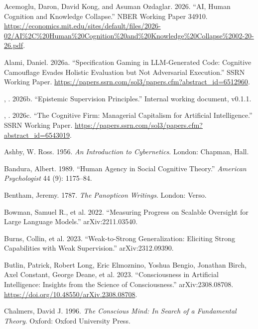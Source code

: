 \documentclass[
  11pt,
]{article}
\newlength{\cslhangindent}
\newenvironment{CSLReferences}[2] %
 {\begin{list}{}{%
  \setlength{\itemindent}{0pt}
  \setlength{\leftmargin}{0pt}
  \setlength{\parsep}{0pt}
  \ifodd #1
   \setlength{\leftmargin}{\cslhangindent}
   \setlength{\itemindent}{-1\cslhangindent}
  \fi
  \setlength{\itemsep}{#2\baselineskip}}}
 {\end{list}}
\begin{document}
\protect{}\label{refs}
\begin{CSLReferences}{1}{0}
Acemoglu, Daron, David Kong, and Asuman Ozdaglar. 2026. {``{AI}, Human
Cognition and Knowledge Collapse.''} NBER Working Paper 34910.
\url{https://economics.mit.edu/sites/default/files/2026-02/AI\%2C\%20Human\%20Cognition\%20and\%20Knowledge\%20Collapse\%2002-20-26.pdf}.

Alami, Daniel. 2026a. {``Specification Gaming in {LLM}-Generated Code:
Cognitive Camouflage Evades Holistic Evaluation but Not Adversarial
Execution.''} SSRN Working Paper.
\url{https://papers.ssrn.com/sol3/papers.cfm?abstract_id=6512960}.

, . 2026b. {``Epistemic Supervision Principles.''} Internal
working document, v0.1.1.

, . 2026c. {``The Cognitive Firm: Managerial Capitalism for
Artificial Intelligence.''} SSRN Working Paper.
\url{https://papers.ssrn.com/sol3/papers.cfm?abstract_id=6543019}.

Ashby, W. Ross. 1956. \emph{An Introduction to Cybernetics}. London:
Chapman, Hall.

Bandura, Albert. 1989. {``Human Agency in Social Cognitive Theory.''}
\emph{American Psychologist} 44 (9): 1175--84.

Bentham, Jeremy. 1787. \emph{The Panopticon Writings}. London: Verso.

Bowman, Samuel R., et al. 2022. {``Measuring Progress on Scalable
Oversight for Large Language Models.''} arXiv:2211.03540.

Burns, Collin, et al. 2023. {``Weak-to-Strong Generalization: Eliciting
Strong Capabilities with Weak Supervision.''} arXiv:2312.09390.

Butlin, Patrick, Robert Long, Eric Elmoznino, Yoshua Bengio, Jonathan
Birch, Axel Constant, George Deane, et al. 2023. {``Consciousness in
Artificial Intelligence: Insights from the Science of Consciousness.''}
arXiv:2308.08708. \url{https://doi.org/10.48550/arXiv.2308.08708}.

Chalmers, David J. 1996. \emph{The Conscious Mind: In Search of a
Fundamental Theory}. Oxford: Oxford University Press.


\end{CSLReferences}
\end{document}
